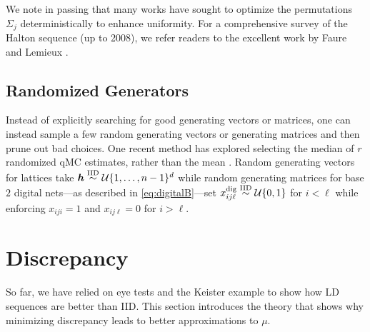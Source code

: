 \documentclass{svproc}
\begin{document}
We note in passing that many works \cite{Atan04,MasChiWar05,tuffin98,vancools06} have sought to optimize the permutations $\Sigma_j$ deterministically to enhance uniformity. For a comprehensive survey of the Halton sequence (up to 2008), we refer readers to the excellent work by Faure and Lemieux \cite{faulem09}.




\subsection{Randomized Generators}

Instead of explicitly searching for good generating vectors or matrices, one can instead sample a few random generating vectors or generating matrices and then prune out bad choices. One recent method has explored selecting the median of $r$ randomized qMC estimates, rather than the mean \cite{PanOwe23a}.  Random generating vectors for lattices take ${\boldsymbol{h}} \overset{\text{IID}}{\sim} {\mathcal{U}}\{1,\dots,n-1\}^d$ while random generating matrices for base $2$ digital nets---as described in \eqref{eq:digitalB}---set $x^{\text{dig}}_{ij\ell} \overset{\text{IID}}{\sim} {\mathcal{U}}\{0,1\}$ for $i<\ell$ while enforcing $x_{iji}=1$ and $x_{ij\ell}=0$ for $i>\ell$. 

\section{Discrepancy} \label{sec:discrepancy}
So far, we have relied on eye tests and the Keister example to show how LD sequences are better than IID.  This section introduces the theory that shows why minimizing discrepancy leads to better approximations to $\mu$.
\end{document}
